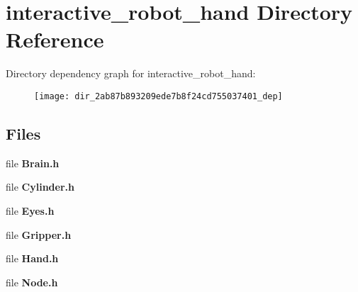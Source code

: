 \section{interactive\-\_\-robot\-\_\-hand Directory Reference}
\label{dir_2ab87b893209ede7b8f24cd755037401}
Directory dependency graph for interactive\-\_\-robot\-\_\-hand\-:\nopagebreak
\begin{figure}[H]
\begin{center}
\leavevmode
\texttt{[image: dir\_2ab87b893209ede7b8f24cd755037401\_dep]}
\end{center}
\end{figure}
\subsection*{Files}
\begin{DoxyCompactItemize}
\item 
file {\bf Brain.\-h}
\item 
file {\bf Cylinder.\-h}
\item 
file {\bf Eyes.\-h}
\item 
file {\bf Gripper.\-h}
\item 
file {\bf Hand.\-h}
\item 
file {\bf Node.\-h}
\end{DoxyCompactItemize}
